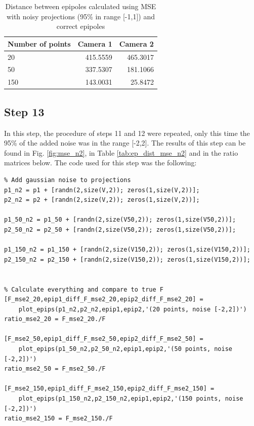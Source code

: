 \documentclass[peerreview,11pt]{IEEEtran}
\begin{document}
\begin{table}[ht]
	\caption{Distance between epipoles calculated using MSE with noisy projections (95\% in range [-1,1]) and correct epipoles}
	\centering
	\begin{tabular}{l | r r }\label{tab:ep_dist_mse_n1}
		Number of points & Camera 1 & Camera 2 \\
		\hline
		20 & 415.5559 & 465.3017 \\
		50 & 337.5307 & 181.1066 \\
		150 & 143.0031 & 25.8472 \\
	\end{tabular}
\end{table}


\subsection{Step 13}

In this step, the procedure of steps 11 and 12 were repeated, only this time the 95\% of the added noise was in the range [-2,2]. The results of this step can be found in Fig. \ref{fig:mse_n2}, in Table \ref{tab:ep_dist_mse_n2} and in the ratio matrices below. The code used for this step was the following:

\begin{verbatim}
% Add gaussian noise to projections
p1_n2 = p1 + [randn(2,size(V,2)); zeros(1,size(V,2))];
p2_n2 = p2 + [randn(2,size(V,2)); zeros(1,size(V,2))];

p1_50_n2 = p1_50 + [randn(2,size(V50,2)); zeros(1,size(V50,2))];
p2_50_n2 = p2_50 + [randn(2,size(V50,2)); zeros(1,size(V50,2))];

p1_150_n2 = p1_150 + [randn(2,size(V150,2)); zeros(1,size(V150,2))];
p2_150_n2 = p2_150 + [randn(2,size(V150,2)); zeros(1,size(V150,2))];


% Calculate everything and compare to true F
[F_mse2_20,epip1_diff_F_mse2_20,epip2_diff_F_mse2_20] =
    plot_epips(p1_n2,p2_n2,epip1,epip2,'(20 points, noise [-2,2])')
ratio_mse2_20 = F_mse2_20./F

[F_mse2_50,epip1_diff_F_mse2_50,epip2_diff_F_mse2_50] =
    plot_epips(p1_50_n2,p2_50_n2,epip1,epip2,'(50 points, noise [-2,2])')
ratio_mse2_50 = F_mse2_50./F

[F_mse2_150,epip1_diff_F_mse2_150,epip2_diff_F_mse2_150] =
    plot_epips(p1_150_n2,p2_150_n2,epip1,epip2,'(150 points, noise [-2,2])')
ratio_mse2_150 = F_mse2_150./F
\end{verbatim}
\end{document}
